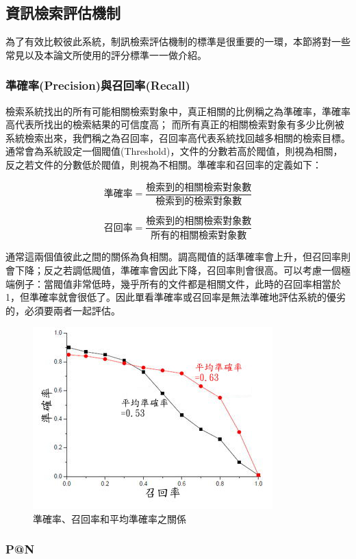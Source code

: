 \subsection{資訊檢索評估機制}
為了有效比較彼此系統，制訊檢索評估機制的標準是很重要的一環，本節將對一些常見以及本論文所使用的評分標準一一做介紹。

\subsubsection{準確率(Precision)與召回率(Recall)}
檢索系統找出的所有可能相關檢索對象中，真正相關的比例稱之為準確率，準確率高代表所找出的檢索結果的可信度高；
而所有真正的相關檢索對象有多少比例被系統檢索出來，我們稱之為召回率，召回率高代表系統找回越多相關的檢索目標。通常會為系統設定一個閥值(Threshold)，文件的分數若高於閥值，則視為相關，反之若文件的分數低於閥值，則視為不相關。準確率和召回率的定義如下：

\[
\text{準確率}=\frac{\text{檢索到的相關檢索對象數}}{\text{檢索到的檢索對象數}}
\]

\[
\text{召回率}=\frac{\text{檢索到的相關檢索對象數}}{\text{所有的相關檢索對象數}}
\]

通常這兩個值彼此之間的關係為負相關。調高閥值的話準確率會上升，但召回率則會下降；反之若調低閥值，準確率會因此下降，召回率則會很高。可以考慮一個極端例子：當閥值非常低時，幾乎所有的文件都是相關文件，此時的召回率相當於1，但準確率就會很低了。因此單看準確率或召回率是無法準確地評估系統的優劣的，必須要兩者一起評估。

\begin{figure}
\centering
\includegraphics[scale=1.0]{images/chap2_precision_recall.png}
\caption{準確率、召回率和平均準確率之關係} \label{fig:precision_recall}
\end{figure}

\subsubsection{P@N}

